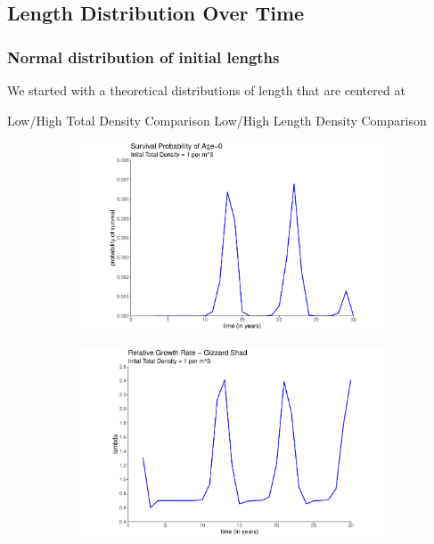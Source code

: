 \documentclass[11pt,oneside]{amsart}
\theoremstyle{definition}
\begin{document}
\subsection{Length Distribution Over Time} 

\subsubsection{Normal distribution of initial lengths}
We started with a theoretical distributions of length that are centered at 

Low/High Total Density Comparison
Low/High Length Density Comparison

\begin{figure}
\centering
\begin{subfigure}[b]{.3\textwidth}
  \includegraphics[width=\textwidth]{figures/Figure4a.pdf}
   \caption{}
  \label{}
\end{subfigure}
\begin{subfigure}[b]{.3\textwidth}
   \includegraphics[width=\textwidth]{figures/Figure4b.pdf}

\end{subfigure}
\end{figure}
\end{document}
